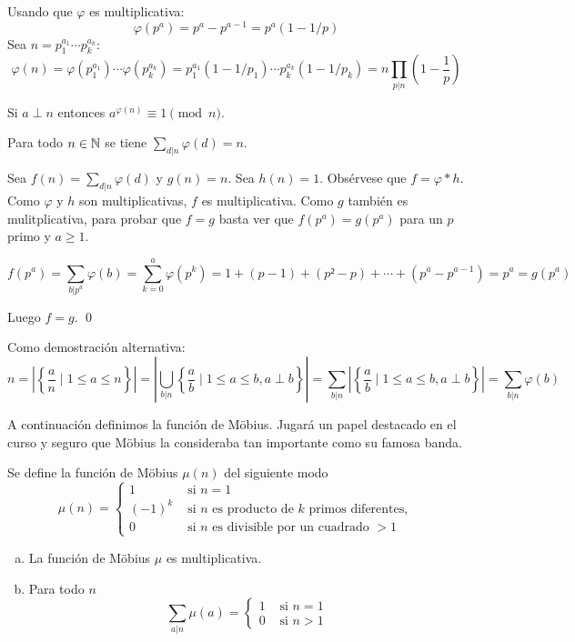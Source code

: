 \documentclass[TAN.tex]{subfiles}
\begin{document}
\begin{dem}
Usando que $φ$ es multiplicativa:
\[ φ(p^a) = p^a - p^{a-1} = p^a(1-1/p) \]
Sea $n = p_1^{a_1}\cdots p_k^{a_k}$:
\[ φ(n) = φ(p_1^{a_1})\cdots φ(p_k^{a_k}) = p_1^{a_1}(1-1/p_1)\cdots p_k^{a_k}(1-1/p_k) = n \prod_{p|n} \left(1-\dfrac{1}{p}\right)\]
\QED
\end{dem}

\begin{teorema}
Si $a \perp n$ entonces $a^{φ(n)} \equiv 1 \pmod n$.
\end{teorema}

\begin{prop}
Para todo $n \in \mathbb{N}$ se tiene $\displaystyle\sum_{d|n} φ(d) = n$.
\end{prop}

\begin{dem}
Sea $f(n) = \sum_{d|n} φ(d)$ y $g(n) = n$. Sea $h(n) = 1$. Obsérvese que $f = φ * h$. Como $φ$ y $h$ son multiplicativas, $f$ es multiplicativa. Como $g$ también es mulitplicativa, para probar que $f = g$ basta ver que $f(p^a)=g(p^a)$ para un $p$ primo y $a ≥ 1$.

\[ f(p^a) = \sum_{b|p^a} φ(b) = \sum_{k=0}^a φ(p^k) = 1+(p-1)+(p²-p)+\cdots+(p^a-p^{a-1}) = p^a = g(p^a) \]

Luego $f = g$.
\qed

Como demostración alternativa:
\[ n = \left|\left\{\frac{a}{n} \mid 1 ≤ a ≤ n\right\}\right|
= \left|\bigcup_{b|n} \left\{\frac{a}{b} \mid 1≤a≤b, a \perp b\right\}\right|
= \sum_{b|n} \left|\left\{\frac{a}{b} \mid 1 ≤ a ≤ b, a \perp b\right\}\right|
= \sum_{b|n} φ(b) \]\QED
\end{dem}

A continuación definimos la función de Möbius. Jugará un papel destacado en el curso y seguro que Möbius la consideraba tan importante como su famosa banda.

\begin{defi}
Se define la función de Möbius $μ(n)$ del siguiente modo
\[ μ(n) = \begin{cases}
	1 &\text{ si }n=1\\
	(-1)^k &\text{ si }n\text{ es producto de }k\text{ primos diferentes},\\
	0 &\text{ si }n\text{ es divisible por un cuadrado }>1
\end{cases}\]
\end{defi}

\begin{prop}
\begin{enumerate}[(a)]
\item La función de Möbius $μ$ es multiplicativa.
\item Para todo $n$
\[ \sum_{a|n} μ(a) = \begin{cases}
	1 & \text{ si } n = 1\\
	0 & \text{ si } n > 1
\end{cases}\]
\end{enumerate}
\end{prop}
\end{document}

